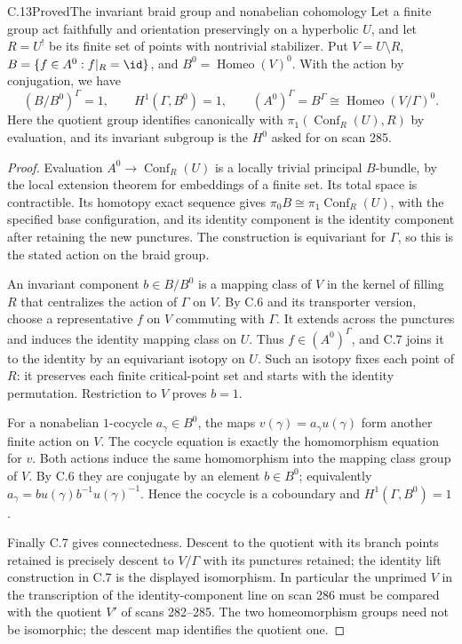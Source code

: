 \begin{claim}{C.13}{Proved}{The invariant braid group and nonabelian cohomology}
Let a finite group act faithfully and orientation preservingly on a
hyperbolic $U$, and let $R=U^!$ be its finite set of points with nontrivial
stabilizer. Put $V=U\setminus R$,
$B=\{f\in A^0:f|_R=\id\}$, and $B^0=\operatorname{Homeo}(V)^0$.
With the action by conjugation, we have
\[
 (B/B^0)^\Gamma=1,\qquad H^1(\Gamma,B^0)=1,
 \qquad (A^0)^\Gamma=B^\Gamma\cong
 \operatorname{Homeo}(V/\Gamma)^0.
\]
Here the quotient group identifies canonically with
$\pi_1(\operatorname{Conf}_R(U),R)$ by evaluation, and its invariant
subgroup is the $H^0$ asked for on scan 285.
\end{claim}
\begin{proof}
Evaluation $A^0\to\operatorname{Conf}_R(U)$ is a locally trivial
principal $B$-bundle, by the local extension theorem for embeddings of
a finite set. Its total space is contractible. Its homotopy exact
sequence gives $\pi_0B\cong\pi_1\operatorname{Conf}_R(U)$, with the
specified base configuration, and its identity component is the
identity component after retaining the new punctures. The construction
is equivariant for $\Gamma$, so this is the stated action on the braid
group.

An invariant component $b\in B/B^0$ is a mapping class of $V$ in the
kernel of filling $R$ that centralizes the action of $\Gamma$ on $V$.
By C.6 and its transporter version, choose a representative $f$ on $V$
commuting with $\Gamma$. It extends across the punctures and induces the
identity mapping class on $U$. Thus $f\in(A^0)^\Gamma$, and C.7 joins
it to the identity by an equivariant isotopy on $U$. Such an isotopy fixes
each point of $R$: it preserves each finite critical-point set and
starts with the identity permutation. Restriction to $V$ proves $b=1$.

For a nonabelian $1$-cocycle $a_\gamma\in B^0$, the maps
$v(\gamma)=a_\gamma u(\gamma)$ form another finite action on $V$.
The cocycle equation is exactly the homomorphism equation for $v$.
Both actions induce the same homomorphism into the mapping class group
of $V$. By C.6 they are conjugate by an element $b\in B^0$; equivalently
$a_\gamma=b u(\gamma)b^{-1}u(\gamma)^{-1}$. Hence the cocycle is a
coboundary and $H^1(\Gamma,B^0)=1$.

Finally C.7 gives connectedness. Descent to the quotient with its branch
points retained is precisely descent to $V/\Gamma$ with its punctures
retained; the identity lift construction in C.7 is the displayed
isomorphism. In particular the unprimed $V$ in the transcription of the
identity-component line on scan 286 must be compared with the quotient
$V'$ of scans 282--285. The two homeomorphism groups need not be
isomorphic; the descent map identifies the quotient one.
\end{proof}

